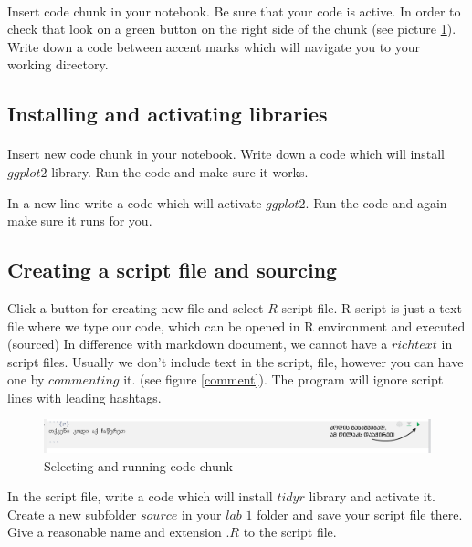\documentclass{article}\usepackage[]{graphicx}\usepackage[]{color}
\begin{document}
\paragraph{}
Insert code chunk in your notebook. Be sure that your code is active. In order to check that look on a green button on the right side of the chunk (see picture \ref{chunk}). Write down a code between accent marks which will navigate you to your working directory.


\subsection*{Installing and activating libraries}
\paragraph{}
Insert new code chunk in your notebook. Write down a code which will install $ggplot2$ library. Run the code and make sure it works.

In a new line write a code which will activate $ggplot2$. Run the code and again make sure it runs for you.


\subsection*{Creating a script file and sourcing}

Click a button for creating new file and select $R$ script file. R script is just a text file where we type our code, which can be opened in R environment and executed (sourced) In difference with markdown document, we cannot have a $rich text$ in script files. Usually we don't include text in the script, file, however you can have one by $commenting$ it. (see figure \ref{comment}). The program will ignore script lines with leading hashtags.

\begin{figure}[h]
\centering
\includegraphics[width=\textwidth]{img/run_chunk.PNG}
\caption{Selecting and running code chunk}
    \label{chunk}
\end{figure}

In the script file, write a code which will install $tidyr$ library and activate it. Create a new subfolder $source$ in your $lab\_1$ folder and save your script file there. Give a reasonable name and extension $.R$ to the script file.
\end{document}

